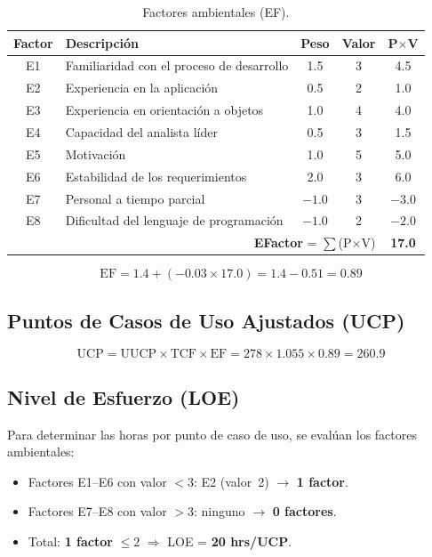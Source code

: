 \begin{table}[H]
\centering
\begin{tabular}{|c|p{}|c|c|c|}
\hline
\textbf{Factor} & \textbf{Descripción} & \textbf{Peso} & \textbf{Valor} & \textbf{P$\times$V} \\
\hline
E1 & Familiaridad con el proceso de desarrollo & 1.5 & 3 & 4.5 \\
\hline
E2 & Experiencia en la aplicación & 0.5 & 2 & 1.0 \\
\hline
E3 & Experiencia en orientación a objetos & 1.0 & 4 & 4.0 \\
\hline
E4 & Capacidad del analista líder & 0.5 & 3 & 1.5 \\
\hline
E5 & Motivación & 1.0 & 5 & 5.0 \\
\hline
E6 & Estabilidad de los requerimientos & 2.0 & 3 & 6.0 \\
\hline
E7 & Personal a tiempo parcial & $-1.0$ & 3 & $-3.0$ \\
\hline
E8 & Dificultad del lenguaje de programación & $-1.0$ & 2 & $-2.0$ \\
\hline
\multicolumn{4}{|r|}{\textbf{EFactor} = $\sum$(P$\times$V)} & \textbf{17.0} \\
\hline
\end{tabular}
\caption{Factores ambientales (EF).}
\label{tab:ef}
\end{table}

\[
\text{EF} = 1.4 + (-0.03 \times 17.0) = 1.4 - 0.51 = \mathbf{0.89}
\]

\subsection{Puntos de Casos de Uso Ajustados (UCP)}

\[
\text{UCP} = \text{UUCP} \times \text{TCF} \times \text{EF} = 278 \times 1.055 \times 0.89 = \mathbf{260.9}
\]

\subsection{Nivel de Esfuerzo (LOE)}

Para determinar las horas por punto de caso de uso, se evalúan los factores ambientales:
\begin{itemize}
    \item Factores E1--E6 con valor $< 3$: E2 (valor~2) $\rightarrow$ \textbf{1 factor}.
    \item Factores E7--E8 con valor $> 3$: ninguno $\rightarrow$ \textbf{0 factores}.
    \item Total: \textbf{1 factor} $\leq 2$ $\Rightarrow$ LOE = \textbf{20 hrs/UCP}.
\end{itemize}

